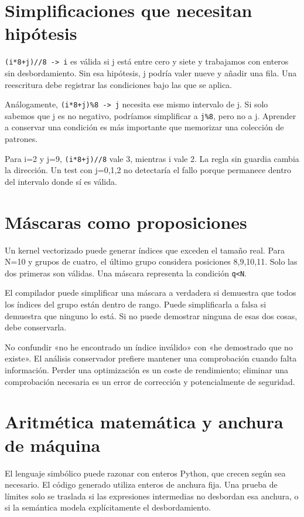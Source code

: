 \documentclass[12pt,a4paper,oneside]{report}
\begin{document}
\section{Simplificaciones que necesitan hipótesis}
\texttt{(i*8+j)//8 -> i} es válida si j está entre cero y siete y trabajamos con enteros sin desbordamiento. Sin esa hipótesis, j podría valer nueve y añadir una fila. Una reescritura debe registrar las condiciones bajo las que se aplica.

Análogamente, \texttt{(i*8+j)\%8 -> j} necesita ese mismo intervalo de j. Si solo sabemos que j es no negativo, podríamos simplificar a \texttt{j\%8}, pero no a j. Aprender a conservar una condición es más importante que memorizar una colección de patrones.

\begin{ejemplo}
Para i=2 y j=9, \texttt{(i*8+j)//8} vale 3, mientras i vale 2. La regla sin guardia cambia la dirección. Un test con j=0,1,2 no detectaría el fallo porque permanece dentro del intervalo donde sí es válida.

\end{ejemplo}
\section{Máscaras como proposiciones}
Un kernel vectorizado puede generar índices que exceden el tamaño real. Para N=10 y grupos de cuatro, el último grupo considera posiciones 8,9,10,11. Solo las dos primeras son válidas. Una máscara representa la condición \texttt{q<N}.

El compilador puede simplificar una máscara a verdadera si demuestra que todos los índices del grupo están dentro de rango. Puede simplificarla a falsa si demuestra que ninguno lo está. Si no puede demostrar ninguna de esas dos cosas, debe conservarla.

No confundir «no he encontrado un índice inválido» con «he demostrado que no existe». El análisis conservador prefiere mantener una comprobación cuando falta información. Perder una optimización es un coste de rendimiento; eliminar una comprobación necesaria es un error de corrección y potencialmente de seguridad.

\section{Aritmética matemática y anchura de máquina}
El lenguaje simbólico puede razonar con enteros Python, que crecen según sea necesario. El código generado utiliza enteros de anchura fija. Una prueba de límites solo se traslada si las expresiones intermedias no desbordan esa anchura, o si la semántica modela explícitamente el desbordamiento.
\end{document}
